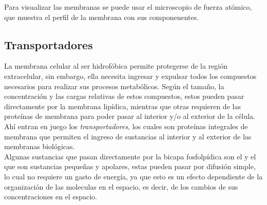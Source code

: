 Para visualizar las membranas se puede usar el microscopio de fuerza at\'{o}mico, que muestra el perfil de la membrana con sus componenentes.\\
\subsection{Transportadores}
La membrana celular al ser hidrof\'{o}bica permite protegerse de la regi\'{o}n extracelular, sin embargo, ella necesita ingresar y expulsar todos los compuestos necesarios para realizar sus procesos metab\'{o}licos. Seg\'{u}n el tama\~{n}o, la concentraci\'{o}n y las cargas relativas de estos compuestos, estos pueden pasar directamente por la membrana lip\'{i}dica, mientras que otras requieren de las prote\'{i}nas de membrana para poder pasar al interior y/o al exterior de la c\'{e}lula. Ah\'{i} entran en juego los \textit{transportadores}, los cuales son prote\'{i}nas integrales de membrana que permiten el ingreso de sustancias al interior y al exterior de las membranas biol\'{o}gicas.\\


Algunas sustancias que pasan directamente por la bicapa fosfolp\'{i}dica son el  y el  que son sustancias peque\~{n}as y apolares, estas pueden pasar por difusi\'{o}n simple, lo cual no requiere un gasto de energ\'{i}a, ya que esto es un efecto dependiente de la organizaci\'{o}n de las moleculas en el espacio, es decir, de los cambios de sus concentraciones en el espacio.\\


